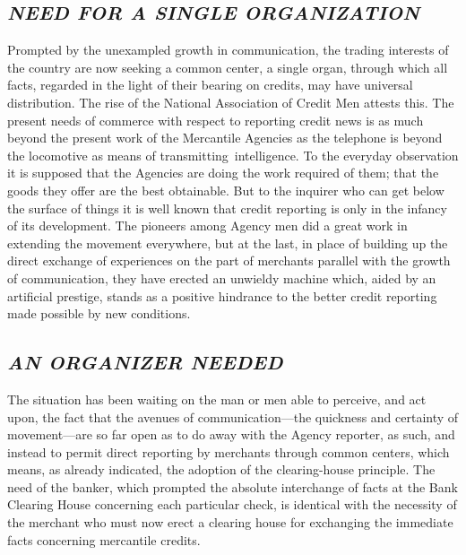 \documentclass[twoside,symmetric,nobib,justified]{tufte-book}
\begin{document}
\hypertarget{need-for-a-single-organization}{%
\subsection{\texorpdfstring{\emph{NEED FOR A SINGLE
ORGANIZATION}}{NEED FOR A SINGLE ORGANIZATION}}\label{need-for-a-single-organization}}

Prompted by the unexampled growth in communication, the trading
interests of the country are now seeking a common center, a single
organ, through which all facts, regarded in the light of their bearing
on credits, may have universal distribution. The rise of the National
Association of Credit Men attests this. The present needs of commerce
with respect to reporting credit news is as much beyond the present work
of the Mercantile Agencies as the telephone is beyond the locomotive as
means of transmitting~intelligence. To the everyday observation it is
supposed that the Agencies are doing the work required of them; that the
goods they offer are the best obtainable. But to the inquirer who can
get below the surface of things it is well known that credit reporting
is only in the infancy of its development. The pioneers among Agency men
did a great work in extending the movement everywhere, but at the last,
in place of building up the direct exchange of experiences on the part
of merchants parallel with the growth of communication, they have
erected an unwieldy machine which, aided by an artificial prestige,
stands as a positive hindrance to the better credit reporting made
possible by new conditions.~

\hypertarget{an-organizer-needed}{%
\subsection{\texorpdfstring{\emph{AN ORGANIZER
NEEDED}}{AN ORGANIZER NEEDED}}\label{an-organizer-needed}}

The situation has been waiting on the man or men able to perceive, and
act upon, the fact that the avenues of communication---the quickness and
certainty of movement---are so far open as to do away with the Agency
reporter, as such, and instead to permit direct reporting by merchants
through common centers, which means, as already indicated, the adoption
of the clearing-house principle. The need of the banker, which prompted
the absolute interchange of facts at the Bank Clearing House concerning
each particular check, is identical with the necessity of the merchant
who must now erect a clearing house for exchanging the immediate facts
concerning mercantile credits.~
\end{document}
